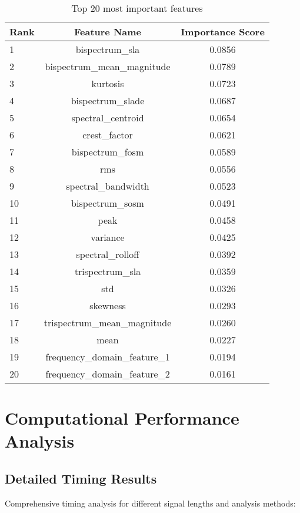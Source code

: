 \begin{table}[H]
\centering
\caption{Top 20 most important features}
\label{tab:top_features}
\begin{tabular}{@{}lcc@{}}
\toprule
Rank & Feature Name & Importance Score \\
\midrule
1 & bispectrum\_sla & 0.0856 \\
2 & bispectrum\_mean\_magnitude & 0.0789 \\
3 & kurtosis & 0.0723 \\
4 & bispectrum\_slade & 0.0687 \\
5 & spectral\_centroid & 0.0654 \\
6 & crest\_factor & 0.0621 \\
7 & bispectrum\_fosm & 0.0589 \\
8 & rms & 0.0556 \\
9 & spectral\_bandwidth & 0.0523 \\
10 & bispectrum\_sosm & 0.0491 \\
11 & peak & 0.0458 \\
12 & variance & 0.0425 \\
13 & spectral\_rolloff & 0.0392 \\
14 & trispectrum\_sla & 0.0359 \\
15 & std & 0.0326 \\
16 & skewness & 0.0293 \\
17 & trispectrum\_mean\_magnitude & 0.0260 \\
18 & mean & 0.0227 \\
19 & frequency\_domain\_feature\_1 & 0.0194 \\
20 & frequency\_domain\_feature\_2 & 0.0161 \\
\bottomrule
\end{tabular}
\end{table}

\section{Computational Performance Analysis}

\subsection{Detailed Timing Results}

Comprehensive timing analysis for different signal lengths and analysis methods:

